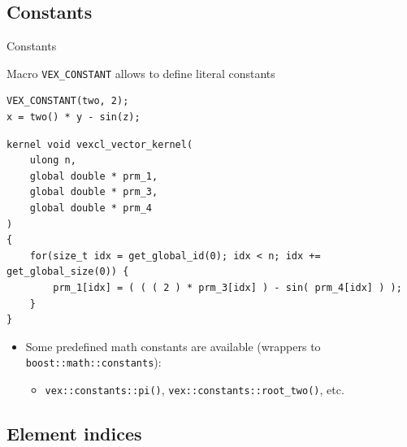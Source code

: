 \documentclass[@BEAMER_OPTIONS@]{beamer}
\newcommand{\code}[1]{\lstinline|#1|}
\begin{document}
\note{ }

\subsection{Constants}

\begin{frame}[fragile]{Constants}
    \begin{exampleblock}{Macro \code{VEX_CONSTANT} allows to define literal constants}
        \begin{lstlisting}
VEX_CONSTANT(two, 2);
x = two() * y - sin(z);
        \end{lstlisting}
    \end{exampleblock}
    \begin{exampleblock}{}
        \begin{lstlisting}
kernel void vexcl_vector_kernel(
    ulong n,
    global double * prm_1,
    global double * prm_3,
    global double * prm_4
)
{
    for(size_t idx = get_global_id(0); idx < n; idx += get_global_size(0)) {
        prm_1[idx] = ( ( ( 2 ) * prm_3[idx] ) - sin( prm_4[idx] ) );
    }
}
        \end{lstlisting}
    \end{exampleblock}
    \begin{itemize}
        \item Some predefined math constants are available (wrappers to
            \code{boost::math::constants}):
            \begin{itemize}
                \item \code{vex::constants::pi()},
                    \code{vex::constants::root_two()}, etc.
            \end{itemize}
    \end{itemize}
\end{frame}

\subsection{Element indices}
\end{document}
